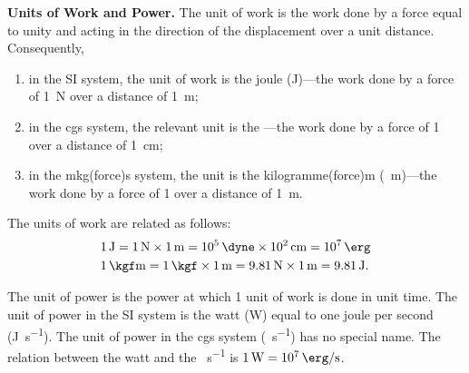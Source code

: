 \textbf{Units of Work and Power.} The unit of work is the work done by a force equal to unity and acting in the direction of the displacement over a unit distance. Consequently,
\begin{enumerate}[(1)]
	\item in the SI system, the unit of work is the joule (\si{\joule})---the work done by a force of \SI{1}{\newton} over a distance of \SI{1}{\metre};
	\item in the cgs system, the relevant unit is the \si{\erg}---the work done by a force of \SI{1}{\dyne} over a distance of \SI{1}{\centi\metre};
	\item in the mkg(force)s system, the unit is the kilogramme(force)m (\si{\kgf\metre})---the work done by a force of \SI{1}{\kgf} over a distance of \SI{1}{\metre}.
\end{enumerate}

The units of work are related as follows:
\begin{align*}
&\SI{1}{\joule} = \SI{1}{\newton}\times\SI{1}{\metre} = \SI{e5}{\dyne}\times\SI{e2}{\centi\metre} = \SI{e7}{\erg}\\
&\SI{1}{\kgf\metre} = \SI{1}{\kgf}\times\SI{1}{\metre} = \SI{9.81}{\newton}\times\SI{1}{\metre} = \SI{9.81}{\joule}.
\end{align*}

The unit of power is the power at which 1 unit of work is done in unit time. The unit of power in the SI system is the watt (\si{\watt}) equal to one joule per second (\si{\joule\per\second}). The unit of power in the cgs system (\si{\erg\per\second}) has no special name. The relation between the watt and the \si{\erg\per\second} is $\SI{1}{\watt}=\SI{e7}{\erg\per\second}$.

